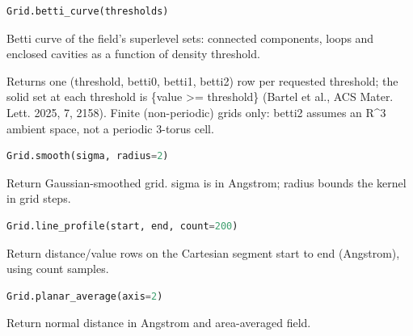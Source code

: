 \begin{samepage}

\begin{lstlisting}[language=Python]
Grid.betti_curve(thresholds)
\end{lstlisting}

Betti curve of the field's superlevel sets: connected components,
loops and enclosed cavities as a function of density threshold.

Returns one (threshold, betti0, betti1, betti2) row per requested
threshold; the solid set at each threshold is \{value >= threshold\}
(Bartel et al., ACS Mater. Lett. 2025, 7, 2158). Finite (non-periodic)
grids only: betti2 assumes an R\textasciicircum{}3 ambient space, not a periodic
3-torus cell.

\end{samepage}



\begin{samepage}

\begin{lstlisting}[language=Python]
Grid.smooth(sigma, radius=2)
\end{lstlisting}

Return Gaussian-smoothed grid. sigma is in Angstrom; radius bounds the kernel in grid steps.

\end{samepage}



\begin{samepage}

\begin{lstlisting}[language=Python]
Grid.line_profile(start, end, count=200)
\end{lstlisting}

Return distance/\allowbreak{}value rows on the Cartesian segment start to end (Angstrom), using count samples.

\end{samepage}



\begin{samepage}

\begin{lstlisting}[language=Python]
Grid.planar_average(axis=2)
\end{lstlisting}

Return normal distance in Angstrom and area-averaged field.

\end{samepage}



